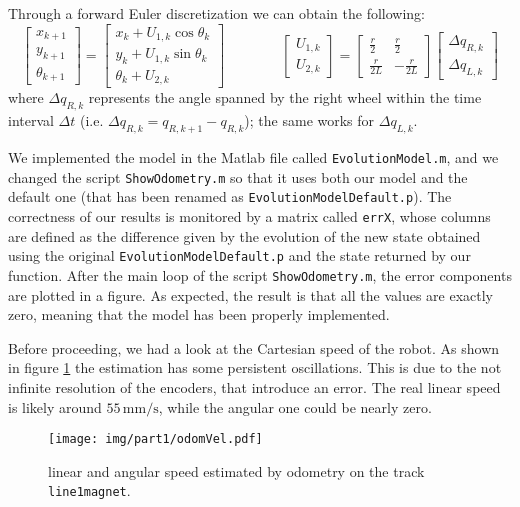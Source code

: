 Through a forward Euler discretization we can obtain the following:
$$\left[\begin{array}{c}
x_{k+1} \\ y_{k+1} \\ \theta_{k+1}
\end{array}\right] =
\left[\begin{array}{c}
x_k + U_{1,k}\cos\theta_k \\ y_k + U_{1,k}\sin\theta_k \\ \theta_k + U_{2,k}
\end{array}\right]
\qquad\qquad
\left[\begin{array}{c}
U_{1,k} \\ U_{2,k}
\end{array}\right] =
\left[\begin{array}{cc}
\frac{r}{2} & \frac{r}{2} \\ \frac{r}{2L} & -\frac{r}{2L}
\end{array}\right] 
\left[\begin{array}{c}
\Delta q_{R,k} \\ \Delta q_{L,k}
\end{array}\right]
$$
where $\Delta q_{R,k}$ represents the angle spanned by the right wheel within the time interval $\Delta t$ (i.e. $\Delta q_{R,k}=q_{R,k+1}-q_{R,k}$); the same works for $\Delta q_{L,k}$.

We implemented the model in the Matlab file called \texttt{EvolutionModel.m}, and we changed the script \texttt{ShowOdometry.m} so that it uses both our model and the default one (that has been renamed as \texttt{EvolutionModelDefault.p}). The correctness of our results is monitored by a matrix called \texttt{errX}, whose columns are defined as the difference given by the evolution of the new state obtained using the original \texttt{EvolutionModelDefault.p} and the state returned by our function. After the main loop of the script \texttt{ShowOdometry.m}, the error components are plotted in a figure. As expected, the result is that all the values are exactly zero, meaning that the model has been properly implemented.

Before proceeding, we had a look at the Cartesian speed of the robot. As shown in figure \ref{figSpeed} the estimation has some persistent oscillations. This is due to the not infinite resolution of the encoders, that introduce an error. The real linear speed is likely around $55\,\textrm{mm/s}$, while the angular one could be nearly zero.

\begin{figure}
	\centering
	\texttt{[image: img/part1/odomVel.pdf]}
	\caption{linear and angular speed estimated by odometry on the track \texttt{line1magnet}.}
	\label{figSpeed}
\end{figure}



